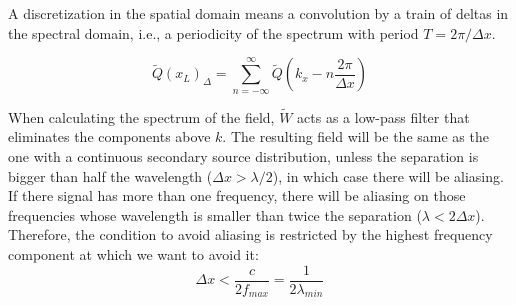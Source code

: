 A discretization in the spatial domain means a convolution by a train of deltas in the spectral domain, i.e., a periodicity of the spectrum with period $T = 2\pi/\Delta x$.

\begin{equation}
\tilde{Q}(x_L)_\Delta = \sum_{n=-\infty}^{\infty} \tilde{Q}(k_x - n\frac{2\pi}{\Delta x})
\end{equation}

When calculating the spectrum of the field, $\tilde{W}$ acts as a low-pass filter that eliminates the components above $k$. The resulting field will be the same as the one with a continuous secondary source distribution, unless the separation is bigger than half the wavelength ($\Delta x > \lambda/2$), in which case there will be aliasing. If there signal has more than one frequency, there will be aliasing on those frequencies whose wavelength is smaller than twice the separation ($\lambda < 2\Delta x$).
Therefore, the condition to avoid aliasing is restricted by the highest frequency component at which we want to avoid it:
\begin{equation}
\Delta x < \frac{c}{2 f_{max}} = \frac{1}{2 \lambda_{min}}
\end{equation}

